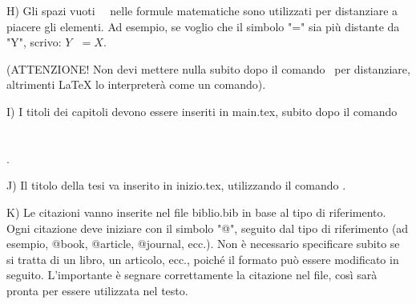 H) Gli spazi vuoti $ \ \ \ $ nelle formule matematiche sono utilizzati per distanziare a piacere gli elementi. Ad esempio, se voglio che il simbolo "=" sia più distante da "Y", scrivo: $Y \ \ \ = X$.

(ATTENZIONE! Non devi mettere nulla subito dopo il comando \ per distanziare, altrimenti LaTeX lo interpreterà come un comando).

I) I titoli dei capitoli devono essere inseriti in main.tex, subito dopo il comando \chapter{}.

J) Il titolo della tesi va inserito in inizio.tex, utilizzando il comando .

K) Le citazioni vanno inserite nel file biblio.bib in base al tipo di riferimento. Ogni citazione deve iniziare con il simbolo "@", seguito dal tipo di riferimento (ad esempio, @book, @article, @journal, ecc.). Non è necessario specificare subito se si tratta di un libro, un articolo, ecc., poiché il formato può essere modificato in seguito. L'importante è segnare correttamente la citazione nel file, così sarà pronta per essere utilizzata nel testo.



